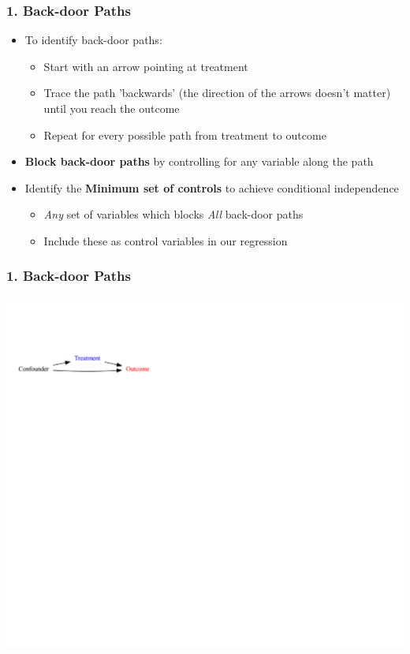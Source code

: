 \documentclass[xcolor=x11names,compress]{beamer}\usepackage[]{graphicx}\usepackage[]{color}
\newenvironment{knitrout}{}{} %
\renewcommand{\(}{\begin{columns}}
\renewcommand{\)}{\end{columns}}
\newcommand{\<}[1]{\begin{column}{#1}}
\renewcommand{\>}{\end{column}}
\begin{document}
\begin{frame}
\frametitle{1. Back-door Paths}
\begin{itemize}
\item To identify back-door paths:
\pause
\begin{itemize}
\item Start with an arrow pointing at treatment
\pause
\item Trace the path 'backwards' (the direction of the arrows doesn't matter) until you reach the outcome
\pause
\item Repeat for every possible path from treatment to outcome
\pause
\end{itemize}
\item \textbf{Block back-door paths} by controlling for any variable along the path
\pause
\item Identify the \textbf{Minimum set of controls} to achieve conditional independence
\pause
\begin{itemize}
\item \textit{Any} set of variables which blocks \textit{All} back-door paths
\pause
\item Include these as control variables in our regression
\end{itemize}
\end{itemize}
\end{frame}

\begin{frame}
\frametitle{1. Back-door Paths}
\begin{knitrout}
\color{fgcolor}
\includegraphics[width=2.5\linewidth]{figure/Dag2b-1} 

\end{knitrout}
\end{frame}
\end{document}
